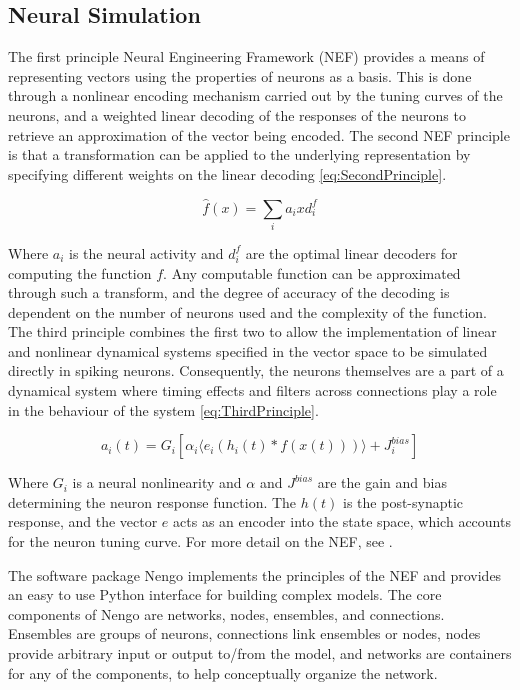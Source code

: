 \documentclass[letterpaper, 10 pt, conference]{ieeeconf}  %
\begin{document}
\subsection{Neural Simulation}

The first principle Neural Engineering Framework (NEF)\cite{eliasmith2004neural} provides a means of representing vectors using the properties of neurons as a basis.
This is done through a nonlinear encoding mechanism carried out by the tuning curves of the neurons, and a weighted linear decoding of the responses of the neurons to retrieve an approximation of the vector being encoded.
The second NEF principle is that a transformation can be applied to the underlying representation by specifying different weights on the linear decoding \eqref{eq:SecondPrinciple}.

\begin{equation} \label{eq:SecondPrinciple}
\hat{f}(x) = \sum_{i} a_{i} x d_{i}^{f}
\end{equation}

Where $a_{i}$ is the neural activity and $d_{i}^{f}$ are the optimal linear decoders for computing the function $f$.
Any computable function can be approximated through such a transform, and the degree of accuracy of the decoding is dependent on the number of neurons used and the complexity of the function.
The third principle combines the first two to allow the implementation of linear and nonlinear dynamical systems specified in the vector space to be simulated directly in spiking neurons.
Consequently, the neurons themselves are a part of a dynamical system where timing effects and filters across connections play a role in the behaviour of the system \eqref{eq:ThirdPrinciple}. 

\begin{equation} \label{eq:ThirdPrinciple}
a_i(t) = G_i [ \alpha_i \langle e_i ( h_i(t)  * f(x(t)) ) \rangle + J^{bias}_i ]
\end{equation}

Where $G_{i}$ is a neural nonlinearity and $\alpha$ and $J^{bias}$ are the gain and bias determining the neuron response function. The $h(t)$ is the post-synaptic response, and the vector $e$ acts as an encoder into the state space, which accounts for the neuron tuning curve.
For more detail on the NEF, see \cite{eliasmith2004neural}.%

The software package Nengo \cite{bekolay2013nengo} implements the principles of the NEF and provides an easy to use Python interface for building complex models.
The core components of Nengo are networks, nodes, ensembles, and connections.
Ensembles are groups of neurons, connections link ensembles or nodes, nodes provide arbitrary input or output to/from the model, and networks are containers for any of the components, to help conceptually organize the network.
\end{document}
